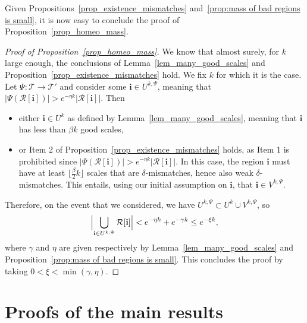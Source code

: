 \documentclass[JEP,XML,SOM,Unicode,NoFloatCountersInSection,published]{cedram}
\newcommand{\Tt}{\mathcal{T}}
\newcommand{\Rr}{\mathcal{R}}
\newcommand{\ii}{\mathbf{i}}
\theoremstyle{plain}
\theoremstyle{definition}
\begin{document}
Given Propositions~\ref{prop_existence_mismatches} and~\ref{prop:mass of bad regions is small}, it is now easy to conclude the proof of Proposition~\ref{prop_homeo_mass}.
\begin{proof}[Proof of Proposition~\ref{prop_homeo_mass}]
We know that almost surely, for $k$ large enough, the conclusions of Lemma~\ref{lem_many_good_scales} and Proposition~\ref{prop_existence_mismatches} hold. We fix $k$ for which it is the case.
Let $\Psi: \Tt \to \Tt'$ and consider some $\ii \in U^{k,\Psi}$, meaning that $\left| \Psi \left( \Rr[\ii] \right) \right| > e^{-\eta k} \left| \Rr[\ii] \right|$.
Then
\begin{itemize}
\item either $\ii \in U^k$ as defined by Lemma~\ref{lem_many_good_scales}, meaning that $\ii$ has less than $\beta k$ good scales,
\item or Item 2 of Proposition~\ref{prop_existence_mismatches} holds, as Item 1 is prohibited since $\left| \Psi \left( \Rr[\ii] \right) \right| > e^{-\eta k} \left| \Rr[\ii] \right|$. In this case, the region $\ii$ must have at least $\lfloor \frac{\beta}{2}k \rfloor$ scales that are $\delta$-mismatches, hence also weak $\delta$-mismatches. This entails, using our initial assumption on $\ii$, that $\ii \in V^{k,\Psi}$.
\end{itemize}
Therefore, on the event that we considered, we have $U^{k,\Psi} \subset U^k \cup V^{k,\Psi}$, so
\begin{align*}
\Bigl|\bigcup_{\ii \in U^{k,\Psi}} \Rr[\ii] \Bigr| < e^{-\eta k} + e^{-\gamma k} \leq e^{-\xi k},
\end{align*}
where $\gamma$ and $\eta$ are given respectively by Lemma~\ref{lem_many_good_scales} and Proposition~\ref{prop:mass of bad regions is small}. This concludes the proof by taking $0<\xi<\min(\gamma,\eta)$.
\end{proof}

\section{Proofs of the main results}\label{sec:proof of main results}
\end{document}
